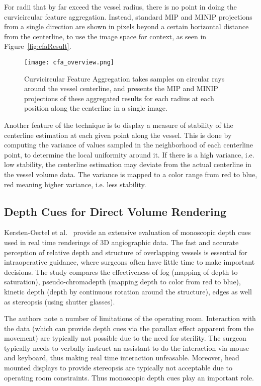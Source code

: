 For radii that by far exceed the vessel radius, there is no point in doing the curvicircular feature aggregation. Instead, standard MIP and MINIP projections from a single direction are shown in pixels beyond a certain horizontal distance from the centerline, to use the image space for context, as seen in Figure~\ref{fig:cfaResult}.
\begin{figure*}[htb]
  \centering
  \texttt{[image: cfa\_overview.png]}
  \caption{\label{fig:cfaOverview} Curvicircular Feature Aggregation takes samples on circular rays around the vessel centerline, and presents the MIP and MINIP projections of these aggregated results for each radius at each position along the centerline in a single image.}
  \cite{mistelbauer2013vessel}
\end{figure*}
Another feature of the technique is to display a measure of stability of the centerline estimation at each given point along the vessel. This is done by computing the variance of values sampled in the neighborhood of each centerline point, to determine the local uniformity around it. If there is a high variance, i.e. low stability, the centerline estimation may deviate from the actual centerline in the vessel volume data. The variance is mapped to a color range from red to blue, red meaning higher variance, i.e. less stability.


\subsection*{Depth Cues for Direct Volume Rendering}

Kersten-Oertel et al.~\cite{kersten2014evaluation} provide an extensive evaluation of monoscopic depth cues used in real time renderings of 3D angiographic data. The fast and accurate perception of relative depth and structure of overlapping vessels is essential for intraoperative guidance, where surgeons often have little time to make important decisions. The study compares the effectiveness of fog (mapping of depth to saturation), pseudo-chromadepth (mapping depth to color from red to blue), kinetic depth (depth by continuous rotation around the structure), edges as well as stereopsis (using shutter glasses). 

The authors note a number of limitations of the operating room. Interaction with the data (which can provide depth cues via the parallax effect apparent from the movement) are typically not possible due to the need for sterility. The surgeon typically needs to verbally instruct an assistant to do the interaction via mouse and keyboard, thus making real time interaction unfeasable. Moreover, head mounted displays to provide stereopsis are typically not acceptable due to operating room constraints. Thus monoscopic depth cues play an important role.


